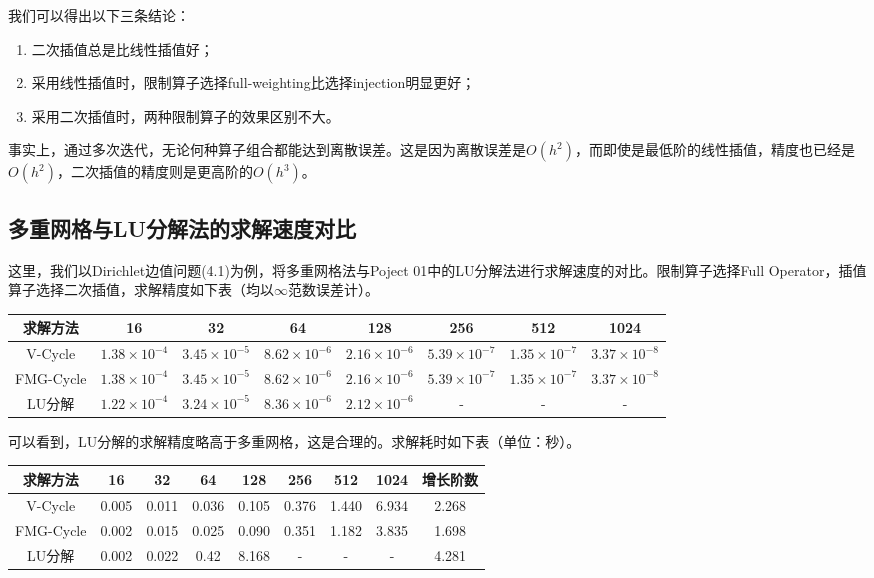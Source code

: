 \documentclass[lang=cn,10pt]{elegantbook}
\begin{document}
我们可以得出以下三条结论：
\begin{enumerate}
  \item 二次插值总是比线性插值好；
  \item 采用线性插值时，限制算子选择full-weighting比选择injection明显更好；
  \item 采用二次插值时，两种限制算子的效果区别不大。
\end{enumerate}

事实上，通过多次迭代，无论何种算子组合都能达到离散误差。这是因为离散误差是$O(h^2)$，而即使是最低阶的线性插值，精度也已经是$O(h^2)$，二次插值的精度则是更高阶的$O(h^3)$。

\subsection{多重网格与LU分解法的求解速度对比}

这里，我们以Dirichlet边值问题(4.1)为例，将多重网格法与Poject 01中的LU分解法进行求解速度的对比。限制算子选择Full Operator，插值算子选择二次插值，求解精度如下表（均以$\infty$范数误差计）。

\begin{table}[H]
  \centering
  \small
  \begin{tabular}{c|ccccccc}
求解方法        & 16                   & 32                   & 64                   & 128                  & 256                  & 512                  & 1024                 \\ \hline
V-Cycle        & $1.38\times 10^{-4}$ & $3.45\times 10^{-5}$ & $8.62\times 10^{-6}$ & $2.16\times 10^{-6}$ & $5.39\times 10^{-7}$ & $1.35\times 10^{-7}$ & $3.37\times 10^{-8}$  \\
FMG-Cycle      & $1.38\times 10^{-4}$ & $3.45\times 10^{-5}$ & $8.62\times 10^{-6}$ & $2.16\times 10^{-6}$ & $5.39\times 10^{-7}$ & $1.35\times 10^{-7}$ & $3.37\times 10^{-8}$  \\
LU分解         & $1.22\times 10^{-4}$ & $3.24\times 10^{-5}$ & $8.36\times 10^{-6}$ & $2.12\times 10^{-6}$ & - & - & - 
\end{tabular}
\end{table}

可以看到，LU分解的求解精度略高于多重网格，这是合理的。求解耗时如下表（单位：秒）。

\begin{table}[H]
  \centering
  \small
  \begin{tabular}{c|ccccccc|c}
求解方法        & 16                   & 32                   & 64                   & 128                  & 256                  & 512                  & 1024                & 增长阶数 \\ \hline
V-Cycle        & 0.005 & 0.011 & 0.036 & 0.105 & 0.376 & 1.440 &  6.934 & 2.268  \\
FMG-Cycle      & 0.002 & 0.015 & 0.025 & 0.090 & 0.351 & 1.182 &  3.835 & 1.698 \\
LU分解         & 0.002 & 0.022 & 0.42 & 8.168 & - & - & - & 4.281
\end{tabular}
\end{table}
\end{document}
